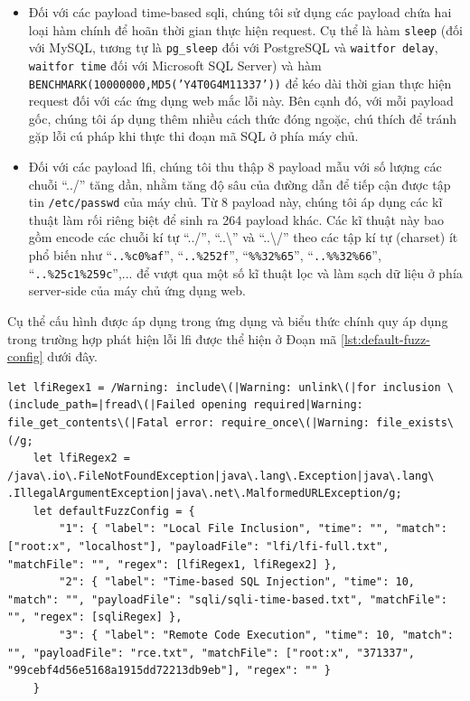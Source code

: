 \begin{itemize}
    \item Đối với các payload time-based \acrshort{sqli}, chúng tôi sử dụng các payload chứa hai loại hàm chính để hoãn thời gian thực hiện request. Cụ thể là hàm \texttt{sleep} (đối với MySQL, tương tự là \texttt{pg\_sleep} đối với PostgreSQL và \texttt{waitfor delay}, \texttt{waitfor time} đối với Microsoft SQL Server) và hàm \\\texttt{BENCHMARK(10000000,MD5('Y4T0G4M11337'))} để kéo dài thời gian thực hiện request đối với các ứng dụng web mắc lỗi này. Bên cạnh đó, với mỗi payload gốc, chúng tôi áp dụng thêm nhiều cách thức đóng ngoặc, chú thích để tránh gặp lỗi cú pháp khi thực thi đoạn mã SQL ở phía máy chủ.
    \item Đối với các payload \acrshort{lfi}, chúng tôi thu thập 8 payload mẫu với số lượng các chuỗi ``../'' tăng dần, nhằm tăng độ sâu của đường dẫn để tiếp cận được tập tin \texttt{/etc/passwd} của máy chủ. Từ 8 payload này, chúng tôi áp dụng các kĩ thuật làm rối riêng biệt để sinh ra 264 payload khác. Các kĩ thuật này bao gồm encode các chuỗi kí tự ``../'', ``..\textbackslash'' và ``..\textbackslash /'' theo các tập kí tự (charset) ít phổ biến như ``\texttt{..\%c0\%af}'', ``\texttt{..\%252f}'', ``\texttt{\%\%32\%65}'', ``\texttt{..\%\%32\%66}'',  ``\texttt{..\%25c1\%259c}'',... để vượt qua một số kĩ thuật lọc và làm sạch dữ liệu ở phía server-side của máy chủ ứng dụng web.
\end{itemize}
Cụ thể cấu hình được áp dụng trong ứng dụng và biểu thức chính quy áp dụng trong trường hợp phát hiện lỗi \acrshort{lfi} được thể hiện ở Đoạn mã \ref{lst:default-fuzz-config} dưới đây.
\begin{lstlisting}[style=ES6, label={lst:default-fuzz-config}, caption={Cấu hình kiểm thử mặc định}]
    let lfiRegex1 = /Warning: include\(|Warning: unlink\(|for inclusion \(include_path=|fread\(|Failed opening required|Warning: file_get_contents\(|Fatal error: require_once\(|Warning: file_exists\(/g;
    let lfiRegex2 = /java\.io\.FileNotFoundException|java\.lang\.Exception|java\.lang\ .IllegalArgumentException|java\.net\.MalformedURLException/g;
    let defaultFuzzConfig = {
        "1": { "label": "Local File Inclusion", "time": "", "match": ["root:x", "localhost"], "payloadFile": "lfi/lfi-full.txt", "matchFile": "", "regex": [lfiRegex1, lfiRegex2] },
        "2": { "label": "Time-based SQL Injection", "time": 10, "match": "", "payloadFile": "sqli/sqli-time-based.txt", "matchFile": "", "regex": [sqliRegex] },
        "3": { "label": "Remote Code Execution", "time": 10, "match": "", "payloadFile": "rce.txt", "matchFile": ["root:x", "371337", "99cebf4d56e5168a1915dd72213db9eb"], "regex": "" }
    }
\end{lstlisting}
